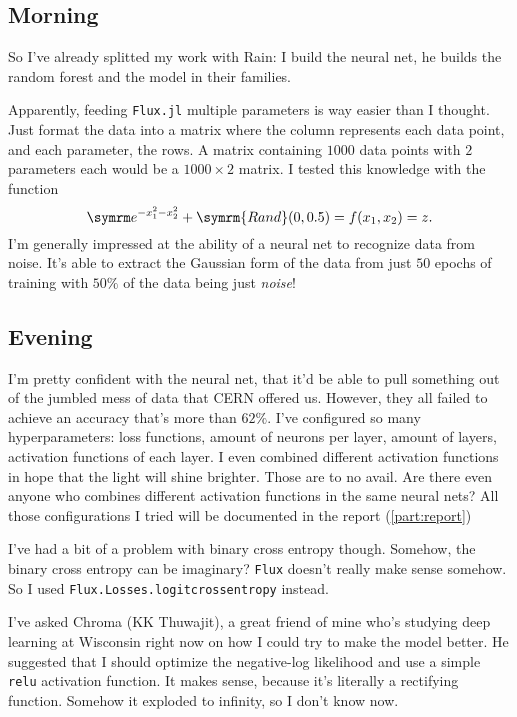 \subsection{Morning}

So I've already splitted my work with Rain: I build the neural net, he builds the random forest and the model in their families.

Apparently, feeding \texttt{Flux.jl} multiple parameters is way easier than I thought. Just format the data into a matrix where the column represents each data point, and each parameter, the rows. A matrix containing $1000$ data points with $2$ parameters each would be a $1000\times 2$ matrix. I tested this knowledge with the function
\begin{equation}
    \e^{-x_1^2 - x_2^2} + \symrm{Rand}(0, 0.5) = f(x_1, x_2) = z.
\end{equation}
I'm generally impressed at the ability of a neural net to recognize data from noise. It's able to extract the Gaussian form of the data from just $50$ epochs of training with $50\%$ of the data being just \emph{noise}!

\subsection{Evening}

I'm pretty confident with the neural net, that it'd be able to pull something out of the jumbled mess of data that CERN offered us. However, they all failed to achieve an accuracy that's more than $62\%$. I've configured so many hyperparameters: loss functions, amount of neurons per layer, amount of layers, activation functions of each layer. I even combined different activation functions in hope that the light will shine brighter. Those are to no avail. Are there even anyone who combines different activation functions in the same neural nets? All those configurations I tried will be documented in the report (\cref{part:report})

I've had a bit of a problem with binary cross entropy though. Somehow, the binary cross entropy can be imaginary? \texttt{Flux} doesn't really make sense somehow. So I used \texttt{Flux.Losses.logitcrossentropy} instead.

I've asked Chroma (KK Thuwajit), a great friend of mine who's studying deep learning at Wisconsin right now on how I could try to make the model better. He suggested that I should optimize the negative-log likelihood and use a simple \texttt{relu} activation function. It makes sense, because it's literally a rectifying function. Somehow it exploded to infinity, so I don't know now.

